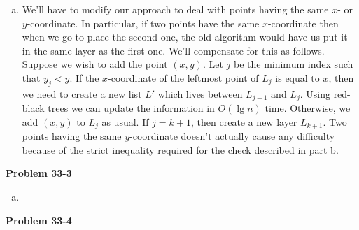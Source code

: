\documentclass{article}
\begin{document}
\begin{enumerate}[a.]
\item We'll have to modify our approach to deal with points having the same $x$- or $y$-coordinate. In particular, if two points have the same $x$-coordinate then when we go to place the second one, the old algorithm would have us put it in the same layer as the first one.  We'll compensate for this as follows.  Suppose we wish to add the point $(x,y)$.  Let $j$ be the minimum index such that $y_j < y$.  If the $x$-coordinate of the leftmost point of $L_j$ is equal to $x$, then we need to create a new list $L'$ which lives between $L_{j-1}$ and $L_j$.  Using red-black trees we can update the information in $O(\lg n)$ time. Otherwise, we add $(x,y)$ to $L_j$ as usual.  If $j=k+1$, then create a new layer $L_{k+1}$.  Two points having the same $y$-coordinate doesn't actually cause any difficulty because of the strict inequality required for the check described in part b. 
\end{enumerate}


\noindent\textbf{Problem 33-3}\\
\begin{enumerate}[a.]
\item
\end{enumerate}


\noindent\textbf{Problem 33-4}\\
\end{document}

